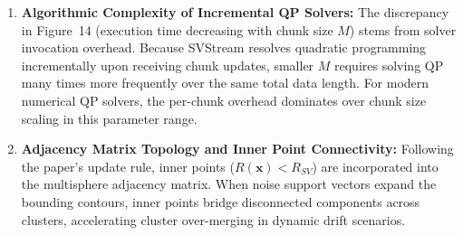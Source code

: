 \begin{enumerate}[label=\textbf{\arabic*.}]
  \item \textbf{Algorithmic Complexity of Incremental QP Solvers:}
  The discrepancy in Figure~14 (execution time decreasing with chunk size $M$) stems from solver invocation overhead. Because SVStream resolves quadratic programming incrementally upon receiving chunk updates, smaller $M$ requires solving QP many times more frequently over the same total data length. For modern numerical QP solvers, the per-chunk overhead dominates over chunk size scaling in this parameter range.

  \item \textbf{Adjacency Matrix Topology and Inner Point Connectivity:}
  Following the paper's update rule, inner points ($R(\mathbf{x}) < R_{SV}$) are incorporated into the multisphere adjacency matrix. When noise support vectors expand the bounding contours, inner points bridge disconnected components across clusters, accelerating cluster over-merging in dynamic drift scenarios.
\end{enumerate}

